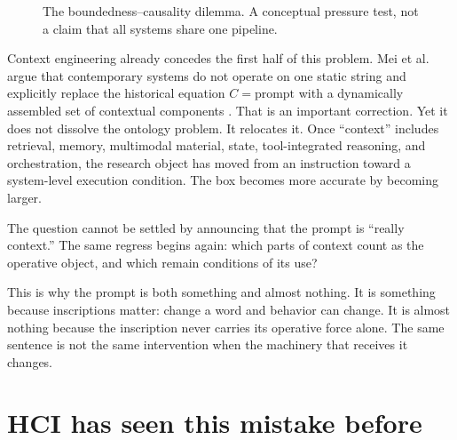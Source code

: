 \documentclass[11pt]{article}
\begin{document}
\begin{figure}[ht]
\centering
{}
\caption{The boundedness--causality dilemma. A conceptual pressure test, not a claim that all systems share one pipeline.}
\label{fig:dilemma}
\end{figure}

Context engineering already concedes the first half of this problem. Mei et al. argue that contemporary systems do not operate on one static string and explicitly replace the historical equation \(C=\text{prompt}\) with a dynamically assembled set of contextual components \citep{Mei2025ContextEngineering}. That is an important correction. Yet it does not dissolve the ontology problem. It relocates it. Once ``context'' includes retrieval, memory, multimodal material, state, tool-integrated reasoning, and orchestration, the research object has moved from an instruction toward a system-level execution condition. The box becomes more accurate by becoming larger.

The question cannot be settled by announcing that the prompt is ``really context.'' The same regress begins again: which parts of context count as the operative object, and which remain conditions of its use?

This is why the prompt is both something and almost nothing. It is something because inscriptions matter: change a word and behavior can change. It is almost nothing because the inscription never carries its operative force alone. The same sentence is not the same intervention when the machinery that receives it changes.

\section{HCI has seen this mistake before}
\end{document}
